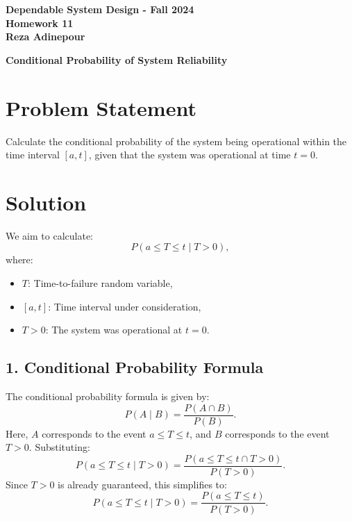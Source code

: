 \documentclass[12pt]{article}
\begin{document}
	
	\begin{center}
		\Large\textbf{Dependable System Design - Fall 2024} \\
		\large\textbf{Homework 11} \\
		\normalsize\textbf{Reza Adinepour}
	\end{center}
	
	\vspace{1cm}
	
	\begin{center}
		\large\textbf{Conditional Probability of System Reliability}\\
	\end{center}
	
	\section*{Problem Statement}
	Calculate the conditional probability of the system being operational within the time interval $[a, t]$, given that the system was operational at time $t = 0$.
	
	\section*{Solution}
	
	We aim to calculate:
	\begin{equation}
		P(a \leq T \leq t \mid T > 0),
	\end{equation}
	where:
	\begin{itemize}
		\item $T$: Time-to-failure random variable,
		\item $[a, t]$: Time interval under consideration,
		\item $T > 0$: The system was operational at $t = 0$.
	\end{itemize}
	
	\subsection*{1. Conditional Probability Formula}
	The conditional probability formula is given by:
	\begin{equation}
		P(A \mid B) = \frac{P(A \cap B)}{P(B)}.
	\end{equation}
	Here, $A$ corresponds to the event $a \leq T \leq t$, and $B$ corresponds to the event $T > 0$. Substituting:
	\begin{equation}
		P(a \leq T \leq t \mid T > 0) = \frac{P(a \leq T \leq t \cap T > 0)}{P(T > 0)}.
	\end{equation}
	Since $T > 0$ is already guaranteed, this simplifies to:
	\begin{equation}
		P(a \leq T \leq t \mid T > 0) = \frac{P(a \leq T \leq t)}{P(T > 0)}.
	\end{equation}
	
\end{document}
